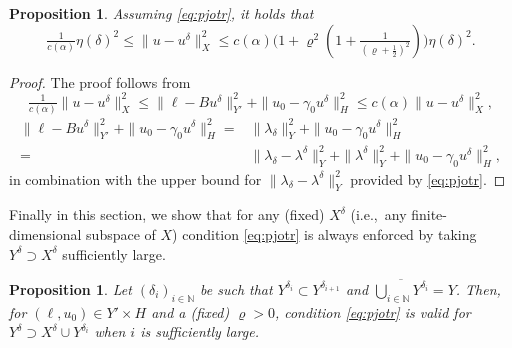 \documentclass{amsart}
\newtheorem{proposition}[theorem]{Proposition}
\numberwithin{equation}{section}
\newcommand{\N}{\mathbb N}
\newcommand{\1}{\mathbb 1}
\begin{document}
 \begin{proposition} \label{prop:1} Assuming \eqref{eq:pjotr}, it holds that
  $$
 \tfrac{1}{c(\alpha)}\eta(\delta)^2 \leq \|u-u^\delta\|_X^2 \leq c(\alpha)\big(1+\varrho^2(1+\tfrac{1}{(\varrho+\frac12)^2})\big) \eta(\delta)^2.
 $$
 \end{proposition}
 \begin{proof} The proof follows from
 $$
\tfrac{1}{c(\alpha)} \|u-u^\delta\|^2_X \leq  \|\ell-B u^\delta\|_{Y'}^2+\|u_0-\gamma_0  u^\delta\|_H^2 \leq c(\alpha)\|u-u^\delta\|_X^2,
$$
 \begin{align*}
 \|\ell-B u^\delta\|_{Y'}^2+\|u_0-\gamma_0  u^\delta\|_H^2=& \|\lambda_\delta\|_Y ^2+\|u_0-\gamma_0  u^\delta\|_H^2\\
 = &\|\lambda_\delta- \lambda^\delta\|_Y^2+\| \lambda^\delta\|^2_Y+ \|u_0-\gamma_0  u^\delta\|_H^2,
 \end{align*}
 in combination with the upper bound for $\|\lambda_\delta- \lambda^\delta\|_Y^2$ provided by \eqref{eq:pjotr}.
  \end{proof}
 
 Finally in this section, we show that for any (fixed) $X^\delta$ (i.e.,~any finite-dimensional subspace of $X$) condition \eqref{eq:pjotr} is always enforced by taking $Y^\delta \supset X^\delta$ sufficiently large. 


\begin{proposition} \label{prop:2} Let $(\delta_i)_{i \in \N}$ be such that $Y^{\delta_i} \subset Y^{\delta_{i+1}}$ and $\overline{\bigcup_{i \in \N} Y^{\delta_i}}=Y$. Then, for $(\ell, u_0) \in Y' \times H$ and a (fixed) $\varrho>0$, condition \eqref{eq:pjotr} is valid for  $Y^\delta  \supset X^\delta \cup Y^{\delta_i}$ when $i$ is sufficiently large.
\end{proposition}
\end{document}
